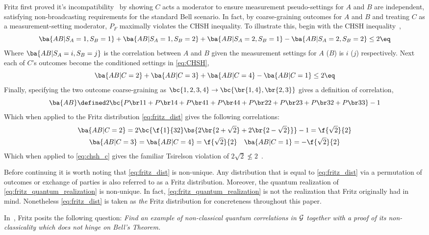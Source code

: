 \documentclass[aps, 10pt, english, twoside, pra, nofootinbib, longbibliography]{revtex4-1}
\begin{document}
    Fritz first proved it's incompatibility~\cite{Fritz_2012} by showing $C$ acts a moderator to ensure measurement pseudo-settings for $A$ and $B$ are independent, satisfying non-broadcasting requirements for the standard Bell scenario. In fact, by coarse-graining outcomes for $A$ and $B$ and treating $C$ as a measurement-setting moderator, $P_F$ maximally violates the CHSH inequality. To illustrate this, begin with the CHSH inequality~\cite{CHSH_Original},
    \[ \ba{AB|S_A=1, S_B=1} + \ba{AB|S_A=1, S_B=2} + \ba{AB|S_A=2, S_B=1} - \ba{AB|S_A=2, S_B=2} \leq 2 \eq \label{eq:CHSH}\]
    Where $\ba{AB|S_A=i, S_B=j}$ is the correlation between $A$ and $B$ given the measurement settings for $A$ ($B$) is $i$ ($j$) respectively. Next each of $C$'s outcomes become the conditioned settings in \cref{eq:CHSH},
    \[ \ba{AB|C=2} + \ba{AB|C=3} + \ba{AB|C=4} - \ba{AB|C=1} \leq 2 \eq \label{eq:chsh_c}\]
    Finally, specifying the two outcome coarse-graining as $\bc{1,2,3,4} \rightarrow \bc{\br{1,4}, \br{2,3}}$ gives a definition of correlation,
    \[ \ba{AB} \defined 2\bc{\prob[][11] + \prob[][14] + \prob[][41] + \prob[][44] + \prob[][22] + \prob[][23] + \prob[][32] + \prob[][33]} - 1 \]
    Which when applied to the Fritz distribution \cref{eq:fritz_dist} gives the following correlations:
    \begin{gather*}
    \ba{AB|C=2} = 2 \bc{\f{1}{32}\bs{2\br{2+\sqrt{2}}+2\br{2-\sqrt{2}}}} - 1 = \f{\sqrt{2}}{2} \\
    \ba{AB|C=3} = \ba{AB|C=4} = \f{\sqrt{2}}{2} \quad \ba{AB|C=1} = -\f{\sqrt{2}}{2}
    \end{gather*}
    Which when applied to \cref{eq:chsh_c} gives the familiar Tsirelson violation of $2\sqrt{2} \not\leq 2$~\cite{Cirelson_1980}.

    Before continuing it is worth noting that \cref{eq:fritz_dist} is non-unique. Any distribution that is equal to \cref{eq:fritz_dist} via a permutation of outcomes or exchange of parties is also referred to as a Fritz distribution. Moreover, the quantum realization of \cref{eq:fritz_quantum_realization} is non-unique. In fact, \cref{eq:fritz_quantum_realization} is not the realization that Fritz originally had in mind. Nonetheless \cref{eq:fritz_dist} is taken as \textit{the} Fritz distribution for concreteness throughout this paper.

    In~\cite{Fritz_2012}, Fritz posits the following question: \textit{Find an example of non-classical quantum correlations in ${\mathcal{G}}$ together with a proof of its non-classicality which does not hinge on Bell’s Theorem.}
\end{document}
